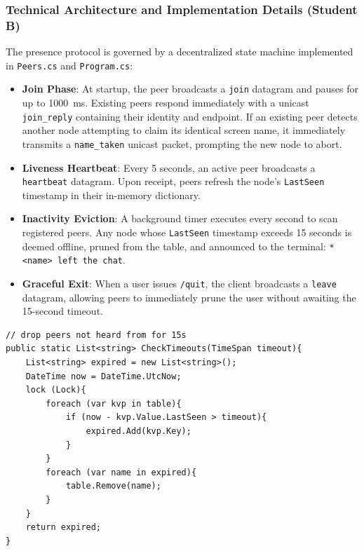 \documentclass[11pt,a4paper]{article}
\begin{document}
\subsubsection{Technical Architecture and Implementation Details (Student B)}
The presence protocol is governed by a decentralized state machine implemented in \texttt{Peers.cs} and \texttt{Program.cs}:
\begin{itemize}
    \item \textbf{Join Phase}: At startup, the peer broadcasts a \texttt{join} datagram and pauses for up to 1000~ms. Existing peers respond immediately with a unicast \texttt{join\_reply} containing their identity and endpoint. If an existing peer detects another node attempting to claim its identical screen name, it immediately transmits a \texttt{name\_taken} unicast packet, prompting the new node to abort.
    \item \textbf{Liveness Heartbeat}: Every 5 seconds, an active peer broadcasts a \texttt{heartbeat} datagram. Upon receipt, peers refresh the node's \texttt{LastSeen} timestamp in their in-memory dictionary.
    \item \textbf{Inactivity Eviction}: A background timer executes every second to scan registered peers. Any node whose \texttt{LastSeen} timestamp exceeds 15 seconds is deemed offline, pruned from the table, and announced to the terminal: \texttt{* <name> left the chat}.
    \item \textbf{Graceful Exit}: When a user issues \texttt{/quit}, the client broadcasts a \texttt{leave} datagram, allowing peers to immediately prune the user without awaiting the 15-second timeout.
\end{itemize}

\begin{lstlisting}[language={[Sharp]C}, caption={Task 2: Thread-safe peer tracking and timeout pruning in Peers.cs.}]
// drop peers not heard from for 15s
public static List<string> CheckTimeouts(TimeSpan timeout){
    List<string> expired = new List<string>();
    DateTime now = DateTime.UtcNow;
    lock (Lock){
        foreach (var kvp in table){
            if (now - kvp.Value.LastSeen > timeout){
                expired.Add(kvp.Key);
            }
        }
        foreach (var name in expired){
            table.Remove(name);
        }
    }
    return expired;
}
\end{lstlisting}
\end{document}
